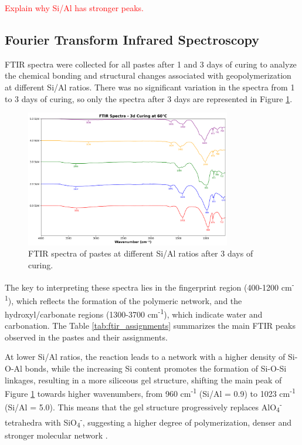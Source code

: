 \textcolor{red}{Explain why Si/Al has stronger peaks.}

\subsection{Fourier Transform Infrared Spectroscopy}

FTIR spectra were collected for all pastes after 1 and 3 days of curing to analyze the chemical bonding and structural changes associated with geopolymerization at different Si/Al ratios.
There was no significant variation in the spectra from 1 to 3 days of curing, so only the spectra after 3 days are represented in Figure \ref{fig:ftir_pastes}.

\begin{figure}[H]
    \centering
    \includegraphics[width=0.8\textwidth]{Cap4/images/ftir_comparison_3d_curing.png}
    \caption{FTIR spectra of pastes at different Si/Al ratios after 3 days of curing.}
    \label{fig:ftir_pastes}
\end{figure}

The key to interpreting these spectra lies in the fingerprint region (400-1200 cm\textsuperscript{-1}), which reflects the formation of the polymeric network, and the hydroxyl/carbonate regions (1300-3700 cm\textsuperscript{-1}), which indicate water and carbonation.
The Table \ref{tab:ftir_assignments} summarizes the main FTIR peaks observed in the pastes and their assignments.

At lower Si/Al ratios, the reaction leads to a network with a higher density of Si-O-Al bonds, while the increasing Si content promotes the formation of Si-O-Si linkages, resulting in a more siliceous gel structure, shifting the main peak of Figure \ref{fig:ftir_pastes} towards higher wavenumbers, from 960 cm\textsuperscript{-1} (Si/Al = 0.9) to 1023 cm\textsuperscript{-1} (Si/Al = 5.0).
This means that the gel structure progressively replaces AlO\textsubscript{4}\textsuperscript{-} tetrahedra with SiO\textsubscript{4}\textsuperscript{-}, suggesting a higher degree of polymerization, denser and stronger molecular network \cite{pachecotorgal2014handbook}.

